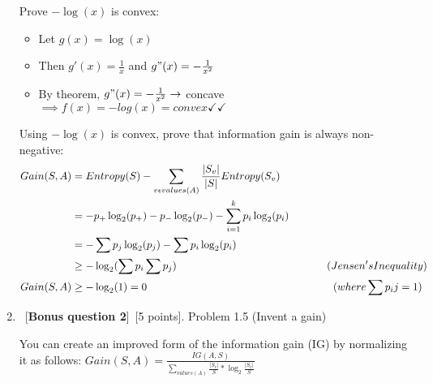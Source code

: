 \documentclass[8pt, fullpage,letterpaper]{article}
\begin{document}
\begin{enumerate}
	\color{violet}
	Prove $-\log(x)$ is convex:
	\begin{itemize}
		\item Let $g(x) = \log(x)$
		\item Then $g'(x) = \frac{1}{x}$ and $g"(x) = -\frac{1}{x^2}$
		\item By theorem, $g"(x) = -\frac{1}{x^2} \to$ concave $\implies f(x) = -log(x) = convex \checkmark \checkmark$
	\end{itemize}
	Using $-\log(x)$ is convex, prove that information gain is always non-negative:
	\begin{align*}
		Gain(S,A) &= Entropy(S) - \sum_{v \epsilon values(A)} \frac{\abs{S_v}}{\abs{S}} Entropy(S_v)\\
		&=  -p_+ \log_2(p_+) -p_- \log_2(p_-) - \sum_{i=1}^{k} p_i \log_2(p_i)\\
		&= - \sum p_j \log_2(p_j) - \sum p_i \log_2(p_i)\\
		&\geq -\log_2(\sum p_i \sum p_j) \hspace{50mm} (Jensen's Inequality) \\
		Gain(S,A) &\geq -\log_2(1) = 0 \hspace{62mm} (where \sum p_ij = 1)
      \end{align*}
	\centerline{}


\color{black}
\item ~[\textbf{Bonus question 2}]~[5 points].  Problem 1.5 (Invent a gain)

	\color{violet}
	
	You can create an improved form of the information gain (IG) by normalizing it as follows:
	\center $Gain(S,A) = \frac{IG(A,S)}{\sum_{values(A)} \frac{|S_v|}{S} * \log_2{\frac{|S_v|}{S}}}$

\end{enumerate}



\end{document}
